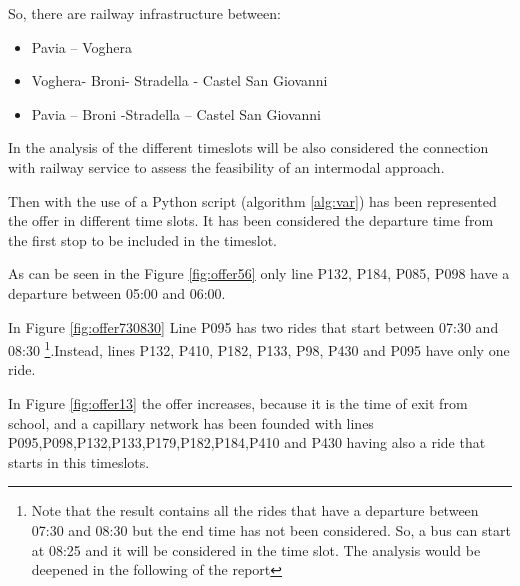 So, there are railway infrastructure between:

\begin{itemize}
    \item Pavia – Voghera
    \item Voghera- Broni- Stradella - Castel San Giovanni
    \item Pavia – Broni -Stradella – Castel San Giovanni
\end{itemize}
In the analysis of the different timeslots will be also considered the connection with railway service to assess the feasibility of an intermodal approach.

Then with the use of a Python script (algorithm \ref{alg:var}) has been represented the offer in different time slots. It has been considered the departure time from the first stop to be included in the timeslot.

As can be seen in the Figure \ref{fig:offer56} only line P132, P184, P085, P098 have a departure between 05:00 and 06:00.

In Figure \ref{fig:offer730830} Line P095 has two rides that  start between 07:30 and 08:30 \footnote{Note that the result contains all the rides that have a departure between 07:30 and 08:30 but the end time has not been considered. So, a bus can start at 08:25 and it will be considered in the time slot. The analysis would be deepened in the following of the report}.Instead, lines P132, P410, P182, P133, P98, P430 and P095 have only one ride.

In Figure \ref{fig:offer13} the offer increases, because it is the time of exit from school, and a capillary network has been founded with lines P095,P098,P132,P133,P179,P182,P184,P410 and P430 having also a ride that starts in this timeslots.

\begin{figure}
\centering
{}\hfill


\end{figure}

